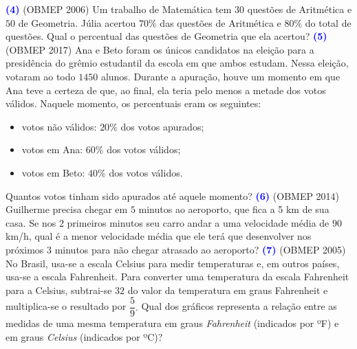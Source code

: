 \documentclass[12pt, a4paper]{article}
\begin{document}
\textcolor{blue}{\bf(4)} (OBMEP 2006) Um trabalho de Matemática tem $30$ questões de Aritmética e $50$ de Geometria. Júlia
acertou $70\%$ das questões de Aritmética e $80\%$ do total de questões. Qual o percentual das questões de Geometria que ela acertou?
\newline\newline
\textcolor{blue}{\bf(5)} (OBMEP 2017) Ana e Beto foram os únicos candidatos na eleição para a presidência do grêmio estudantil da escola em que ambos estudam. Nessa eleição, votaram ao todo $1450$ alunos. Durante a apuração, houve um momento em que Ana teve a certeza de que, ao final, ela teria pelo menos a metade dos votos válidos. Naquele momento, os percentuais eram os seguintes:
\begin{itemize}
    \item votos não válidos: $20\%$ dos votos apurados;
    \item votos em Ana: $60\%$ dos votos válidos;
    \item votos em Beto: $40\%$ dos votos válidos.
\end{itemize}
Quantos votos tinham sido apurados até aquele momento?
\newline\newline
\textcolor{blue}{\bf(6)} (OBMEP 2014) Guilherme precisa chegar em $5$ minutos ao aeroporto, que fica a 5 km de sua casa. Se nos $2$ primeiros minutos seu carro andar a uma velocidade média de $90$ km/h, qual é a menor velocidade média que ele terá que desenvolver nos próximos $3$ minutos para não chegar atrasado ao aeroporto?
\newline\newline
\textcolor{blue}{\bf(7)} (OBMEP 2005) No Brasil, usa-se a escala Celsius para medir temperaturas e, em outros países, usa-se a escala Fahrenheit. Para converter uma temperatura da escala Fahrenheit para a Celsius, subtrai-se $32$ do valor da temperatura em graus Fahrenheit e multiplica-se o resultado por $\dfrac{5}{9}.$ Qual dos gráficos representa a relação entre as medidas de uma mesma temperatura em graus \textit{Fahrenheit} (indicados por ºF) e em graus \textit{Celsius}
(indicados por ºC)?
\end{document}
